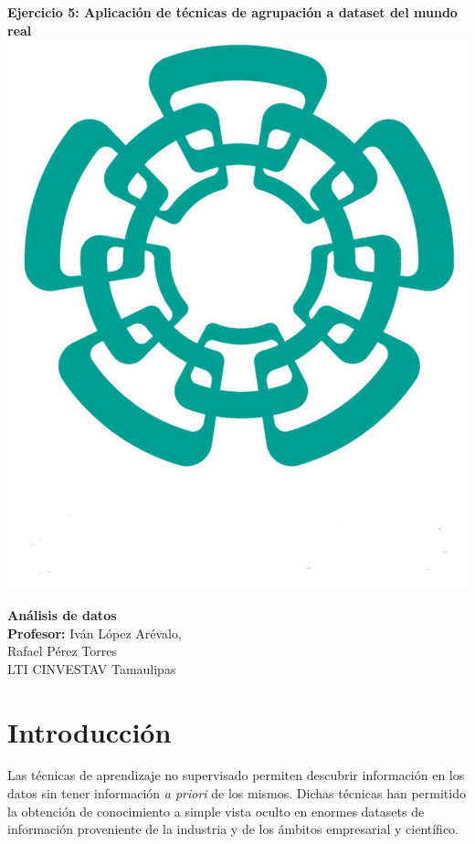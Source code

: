\documentclass[12pt]{article}
\numberwithin{equation}{section}
\numberwithin{table}{section}
\numberwithin{figure}{section}
\begin{document}
\begin{center}
\textbf{\Large Ejercicio 5: Aplicación de técnicas de agrupación a dataset del mundo real} \\[16pt]

\includegraphics[scale=0.08]{imagenes/cinvestav2}

\textbf{Análisis de datos}\\[10pt]

\textbf{Profesor:} Iván López Arévalo,\\[16pt]
Rafael Pérez Torres\\[16pt]

LTI CINVESTAV Tamaulipas \\[16pt]

\end{center}

\section{Introducción}
Las técnicas de aprendizaje no supervisado permiten descubrir información en los datos sin tener información \emph{a priori} de los mismos.
Dichas técnicas han permitido la obtención de conocimiento a simple vista oculto en enormes datasets de información proveniente de la industria y de los ámbitos empresarial y científico.
\end{document}
